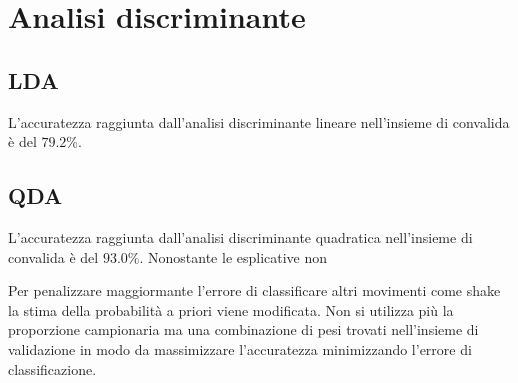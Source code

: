 \documentclass[./main.tex]{subfiles}
\begin{document}
\section{Analisi discriminante}
\subsection*{LDA}
L'accuratezza raggiunta dall'analisi discriminante lineare nell'insieme di convalida è del $79.2\%$.


\subsection*{QDA}
L'accuratezza raggiunta dall'analisi discriminante quadratica nell'insieme di convalida è del $93.0\%$. Nonostante le esplicative non 


Per penalizzare maggiormante l'errore di classificare altri movimenti come shake la stima della probabilità a priori viene modificata. Non si utilizza più la proporzione campionaria ma una combinazione di pesi trovati nell'insieme di validazione in modo da  massimizzare l'accuratezza minimizzando l'errore di classificazione.
\end{document}
